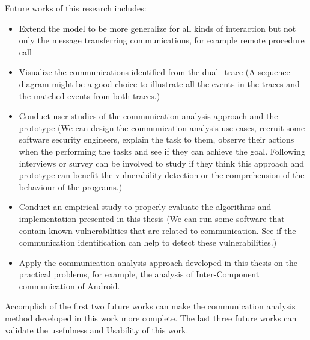 Future works of this research includes:
\begin{itemize}
\item Extend the model to be more generalize for all kinds of interaction but not only the message transferring communications, for example remote procedure call
\item Visualize the communications identified from the dual\_trace (A sequence diagram might be a good choice to illustrate all the events in the traces and the matched events from both traces.) 
\item Conduct user studies of the communication analysis approach and the prototype (We can design the communication analysis use cases, recruit some software security engineers, explain the task to them, observe their actions when the performing the tasks and see if they can achieve the goal. Following interviews or survey can be involved to study if they think this approach and prototype can benefit the vulnerability detection or the comprehension of the behaviour of the programs.)
\item Conduct an empirical study to properly evaluate the algorithms and implementation presented in this thesis (We can run some software that contain known vulnerabilities that are related to communication. See if the communication identification can help to detect these vulnerabilities.)
\item Apply the communication analysis approach developed in this thesis on the practical problems, for example, the analysis of Inter-Component communication of Android. 
\end{itemize}

Accomplish of the first two future works can make the communication analysis method developed in this work more complete. The last three future works can validate the usefulness and Usability of this work.


